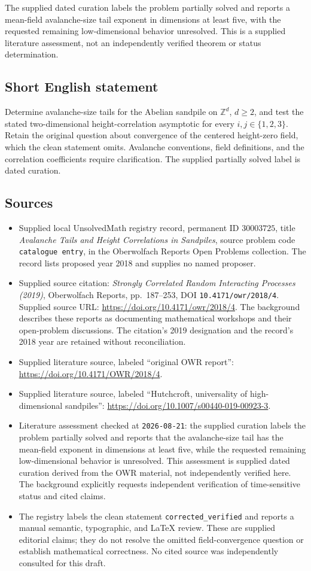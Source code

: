 \documentclass[11pt]{article}
\newcommand{\Z}{\mathbb{Z}}
\begin{document}
The supplied dated curation labels the problem partially solved and reports a mean-field avalanche-size tail exponent in dimensions at least five, with the requested remaining low-dimensional behavior unresolved. This is a supplied literature assessment, not an independently verified theorem or status determination.
\subsection{Short English statement}
Determine avalanche-size tails for the Abelian sandpile on \(\Z^d\), \(d\geq2\), and test the stated two-dimensional height-correlation asymptotic for every \(i,j\in\{1,2,3\}\). Retain the original question about convergence of the centered height-zero field, which the clean statement omits. Avalanche conventions, field definitions, and the correlation coefficients require clarification. The supplied partially solved label is dated curation.
\subsection{Sources}
\begin{itemize}
\item Supplied local UnsolvedMath registry record, permanent ID \(30003725\), title \emph{Avalanche Tails and Height Correlations in Sandpiles}, source problem code \texttt{catalogue entry}, in the Oberwolfach Reports Open Problems collection. The record lists proposed year 2018 and supplies no named proposer.
\item Supplied source citation: \emph{Strongly Correlated Random Interacting Processes (2019)}, Oberwolfach Reports, pp.\ 187--253, DOI \texttt{10.4171/owr/2018/4}. Supplied source URL: \url{https://doi.org/10.4171/owr/2018/4}. The background describes these reports as documenting mathematical workshops and their open-problem discussions. The citation's 2019 designation and the record's 2018 year are retained without reconciliation.
\item Supplied literature source, labeled ``original OWR report'': \url{https://doi.org/10.4171/OWR/2018/4}.
\item Supplied literature source, labeled ``Hutchcroft, universality of high-dimensional sandpiles'': \url{https://doi.org/10.1007/s00440-019-00923-3}.
\item Literature assessment checked at \texttt{2026-08-21}: the supplied curation labels the problem partially solved and reports that the avalanche-size tail has the mean-field exponent in dimensions at least five, while the requested remaining low-dimensional behavior is unresolved. This assessment is supplied dated curation derived from the OWR material, not independently verified here. The background explicitly requests independent verification of time-sensitive status and cited claims.
\item The registry labels the clean statement \texttt{corrected\_verified} and reports a manual semantic, typographic, and LaTeX review. These are supplied editorial claims; they do not resolve the omitted field-convergence question or establish mathematical correctness. No cited source was independently consulted for this draft.
\end{itemize}
\end{document}
